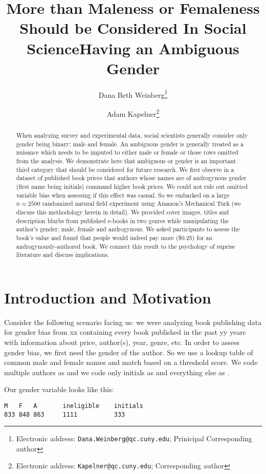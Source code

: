 \documentclass[12pt]{article}
\title{More than Maleness or Femaleness Should be Considered In Social Science}
\title{Having an Ambiguous Gender}
\author[1]{Dana Beth Weinberg\thanks{Electronic address: \texttt{Dana.Weinberg@qc.cuny.edu}; Prinicipal Corresponding author}}
\author[2]{Adam Kapelner\thanks{Electronic address: \texttt{Kapelner@qc.cuny.edu}; Corresponding author}}
\affil[1]{Dept. of Sociology,  Queens College, The City University of New York}
\affil[2]{Dept. of Mathematics,  Queens College, The City University of New York}
\begin{document}
\maketitle

\begin{abstract}
When analyzing survey and experimental data, social scientists generally consider only gender being binary: male and female. An ambiguous gender is generally treated as a nuisance which needs to be imputed to either male or female or those rows omitted from the analysis. We demonstrate here that ambiguous or  gender is an important third category that should be considered for future research. We first observe in a dataset of published book prices that authors whose names are of androgynous gender (first name being initials) command higher book prices. We could not rule out omitted variable bias when assessing if this effect was causal. So we embarked on a large $n \approx 2500$ randomized natural field experiment using Amazon's Mechanical Turk (we discuss this methodology herein in detail). We provided cover images, titles and description blurbs from published e-books in two genres while manipulating the author's gender: male, female and androgynous. We asked participants to assess the book's value and found that people would indeed pay more (\$0.25) for an androgynously-authored book. We connect this result to the psychology of suprise literature and discuss implications.
\end{abstract}
\vspace{8cm}\pagebreak

\section{Introduction and Motivation}\label{sec:intro}

Consider the following scenario facing us: we were analyzing book publishing data for gender bias from xx containing every book published in the past yy years with information about price, author(s), year, genre, etc. In order to assess gender bias, we first need the gender of the author. So we use a lookup table of common male and female names and match based on a threshold score. We code multiple authors as  and we code only initials as  and everything else as .

Our gender variable looks like this:


\begin{verbatim}
M   F   A       ineligible    initials
833 848 863     1111          333
\end{verbatim}
\end{document}
